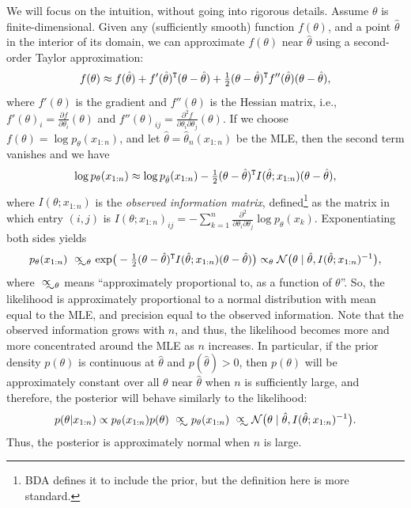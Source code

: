 \documentclass[12pt]{article}
\begin{document}
We will focus on the intuition, without going into rigorous details. 
Assume $\theta$ is finite-dimensional.
Given any (sufficiently smooth) function $f(\theta)$, and a point $\hat\theta$ in the interior of its domain, we can approximate $f(\theta)$ near $\hat\theta$ using a second-order Taylor approximation:
$$ f(\theta) \approx f(\hat\theta) + f'(\hat\theta)^{\mathtt{T}} (\theta - \hat\theta) + \tfrac{1}{2}(\theta - \hat\theta)^{\mathtt{T}} f''(\hat\theta) (\theta - \hat\theta), $$
where $f'(\theta)$ is the gradient and $f''(\theta)$ is the Hessian matrix, i.e., $f'(\theta)_i = \frac{\partial f}{\partial \theta_i}(\theta)$ and $f''(\theta)_{i j} = \frac{\partial^2 f}{\partial \theta_i \partial \theta_j}(\theta)$. If we choose $f(\theta) = \log p_\theta(x_{1:n})$, and let $\hat\theta = \hat\theta_n(x_{1:n})$ be the MLE, then the second term vanishes and we have
$$ \log p_{\theta}(x_{1:n}) \approx \log p_{\hat\theta}(x_{1:n}) - \tfrac{1}{2}(\theta - \hat\theta)^{\mathtt{T}} I(\hat\theta; x_{1:n}) (\theta - \hat\theta), $$
where $I(\theta; x_{1:n})$ is the \textit{observed information matrix}, defined\footnote{BDA defines it to include the prior, but the definition here is more standard.} as the matrix in which entry $(i,j)$ is
$ I(\theta; x_{1:n})_{ij}= -\sum_{k = 1}^n \frac{\partial^2}{\partial \theta_i \partial \theta_j}\log p_\theta(x_k). $
Exponentiating both sides yields
$$p_{\theta}(x_{1:n}) \approxprop_{\!\! \theta}\, \exp\!\big(- \tfrac{1}{2}(\theta - \hat\theta)^\T I(\hat\theta; x_{1:n}) (\theta - \hat\theta)\big)
\propto_{\theta} \N \big(\theta \mid\hat\theta, I(\hat\theta; x_{1:n})^{-1} \big), $$
where $\approxprop_{\!\! \theta}$ means ``approximately proportional to, as a function of $\theta$''.
So, the likelihood is approximately proportional to a normal distribution with mean equal to the MLE, and precision equal to the observed information. Note that the observed information grows with $n$, and thus, the likelihood becomes more and more concentrated  around the MLE as $n$ increases. In particular, if the prior density $p(\theta)$ is continuous at $\hat\theta$ and $p(\hat\theta) >0$, then $p(\theta)$ will be approximately constant over all $\theta$ near $\hat\theta$ when $n$ is sufficiently large, and therefore, the posterior will behave similarly to the likelihood:
\begin{align} \label{equation:asymptotic-normality}
p(\theta | x_{1:n}) \propto p_\theta(x_{1:n}) p(\theta)
\approxprop p_\theta(x_{1:n}) \approxprop \N \big(\theta \mid\hat\theta, I(\hat\theta; x_{1:n})^{-1} \big).
\end{align}
Thus, the posterior is approximately normal when $n$ is large.
\end{document}
